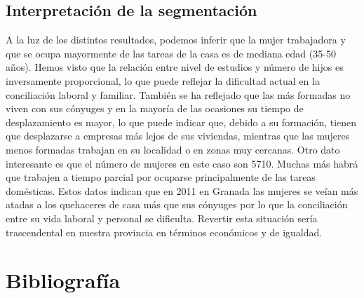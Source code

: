 \subsection{Interpretación de la segmentación}

A la luz de los distintos resultados, podemos inferir que la mujer trabajadora y que se ocupa mayormente de las tareas de la casa es de mediana edad (35-50 años). Hemos visto que la relación entre nivel de estudios y número de hijos es inversamente proporcional, lo que puede reflejar la dificultad actual en la conciliación laboral y familiar. También se ha reflejado que las más formadas no viven con sus cónyuges y en la mayoría de las ocasiones su tiempo de desplazamiento es mayor, lo que puede indicar que, debido a su formación, tienen que desplazarse a empresas más lejos de sus viviendas, mientras que las mujeres menos formadas trabajan en su localidad o en zonas muy cercanas.  Otro dato interesante es que el número de mujeres en este caso son 5710. Muchas más habrá que trabajen a tiempo parcial por ocuparse principalmente de las tareas domésticas. Estos datos indican que en 2011 en Granada las mujeres se veían más atadas a los quehaceres de casa más que sus cónyuges por lo que la conciliación entre su vida laboral y personal se dificulta. Revertir esta situación sería trascendental en nuestra provincia en términos económicos y de igualdad.
\newpage
\section{Bibliografía}




